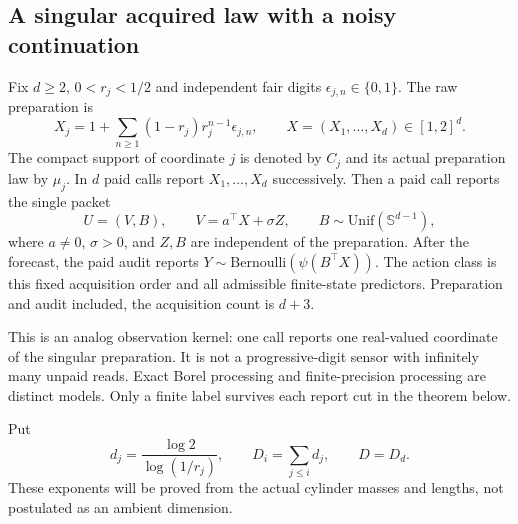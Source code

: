 \subsection{A singular acquired law with a noisy continuation}
Fix $d\ge2$, $0<r_j<1/2$ and independent fair digits $\epsilon_{j,n}\in\{0,1\}$. The raw preparation is
\begin{equation}\label{eq:singularraw}
 X_j=1+\sum_{n\ge1}(1-r_j)r_j^{n-1}\epsilon_{j,n},\qquad
 X=(X_1,\ldots,X_d)\in[1,2]^d.
\end{equation}
The compact support of coordinate $j$ is denoted by $C_j$ and its actual preparation law by $\mu_j$. In $d$ paid calls report $X_1,\ldots,X_d$ successively. Then a paid call reports the single packet
\[
 U=(V,B),\qquad V=a^\top X+\sigma Z,\qquad
 B\sim\mathrm{Unif}(\mathbb S^{d-1}),
\]
where $a\ne0$, $\sigma>0$, and $Z,B$ are independent of the preparation. After the forecast, the paid audit reports $Y\sim\mathrm{Bernoulli}(\psi(B^\top X))$. The action class is this fixed acquisition order and all admissible finite-state predictors. Preparation and audit included, the acquisition count is $d+3$.

This is an analog observation kernel: one call reports one real-valued coordinate of the singular preparation. It is not a progressive-digit sensor with infinitely many unpaid reads. Exact Borel processing and finite-precision processing are distinct models. Only a finite label survives each report cut in the theorem below.

Put
\[
 d_j=\frac{\log 2}{\log(1/r_j)},\qquad D_i=\sum_{j\le i}d_j,
 \qquad D=D_d.
\]
These exponents will be proved from the actual cylinder masses and lengths, not postulated as an ambient dimension.

